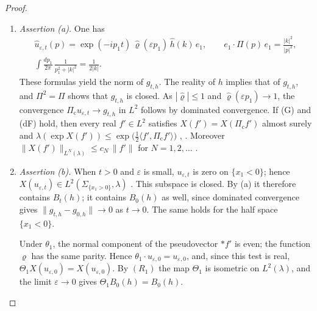 \documentclass[11pt,letterpaper,reqno]{amsart}
\theoremstyle{definition}
\begin{document}
\begin{proof}
\begin{enumerate}
\item[1.] \emph{Assertion (a).}
One has
\begin{gather*}
\hat u_{\varepsilon,t}(p)=\exp(-ip_1t)\,\hat\varrho(\varepsilon p_1)\,\hat h(k)\,e_1,\qquad
e_1\cdot\Pi(p)\,e_1=\frac{|k|^2}{|p|^2},\\
\int\frac{dp_1}{2\pi}\,\frac{1}{p_1^2+|k|^2}=\frac{1}{2|k|}.
\end{gather*}
These formulas yield the norm of $g_{t,h}$.
The reality of $h$ implies that of $g_{t,h}$, and $\Pi^2=\Pi$ shows that $g_{t,h}$ is closed.
As $|\hat\varrho|\le1$ and $\hat\varrho(\varepsilon p_1)\to1$, the convergence $\Pi_{\mathrm c}u_{\varepsilon,t}\to g_{t,h}$ in $L^2$ follows by dominated convergence.
If (G) and (dF) hold, then every real $f'\in L^2$ satisfies $X(f')=X(\Pi_{\mathrm c}f')$ almost surely and $\lambda(\exp X(f'))\le\exp\bigl(\frac12\langle f',\allowbreak \Pi_{\mathrm c}f'\rangle\bigr)$ \cite[Proposition~5.1 and Section~5.2]{QEDConstruction}, \cite[Section~8.1]{QEDConstruction}.
Moreover $\|X(f')\|_{L^N(\lambda)}\le c_N\,\|f'\|$ for $N=1,2,\dots$ \cite[Proposition~5.1]{QEDConstruction}.
\item[2.] \emph{Assertion (b).}
When $t>0$ and $\varepsilon$ is small, $u_{\varepsilon,t}$ is zero on $\{x_1<0\}$; hence $X(u_{\varepsilon,t})\in L^2(\Sigma_{\{x_1>0\}},\lambda)$ \cite[Proposition~5.1]{QEDConstruction}.
This subspace is closed.
By (a) it therefore contains $B_t(h)$; it contains $B_0(h)$ as well, since dominated convergence gives $\|g_{t,h}-g_{0,h}\|\to0$ as $t\to0$.
The same holds for the half space $\{x_1<0\}$.

Under $\theta_1$, the normal component of the pseudovector $\ast f'$ is even; the function $\varrho$ has the same parity.
Hence $\theta_1\cdot u_{\varepsilon,0}=u_{\varepsilon,0}$, and, since this test is real, $\Theta_1X(u_{\varepsilon,0})=X(u_{\varepsilon,0})$.
By $(R_1)$ the map $\Theta_1$ is isometric on $L^2(\lambda)$, and the limit $\varepsilon\to0$ gives $\Theta_1B_0(h)=B_0(h)$.


\end{enumerate}
\end{proof}
\end{document}
